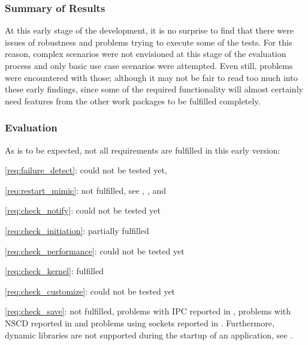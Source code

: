 \subsubsection{Summary of Results}
At this early stage of the development, it is no surprise to find that there were issues of robustness and problems trying to execute some of the tests. For this reason, complex scenarios were not envisioned at this stage of the evaluation process and only basic use case scenarios were attempted. Even still, problems were encountered with those; although it may not be fair to read too much into these early findings, since some of the required functionality will almost certainly need features from the other work packages to be fulfilled completely.

\subsubsection{Evaluation}

As is to be expected, not all requirements are fulfilled in this early version:
\begin{description}
	\item{\ref{req:failure_detect}}: could not be tested yet,
	\item{\ref{req:restart_mimic}}: not fulfilled, see , , and 
	\item{\ref{req:check_notify}}: could not be tested yet
	\item{\ref{req:check_initiation}}: partially fulfilled
	\item{\ref{req:check_performance}}: could not be tested yet
	\item{\ref{req:check_kernel}}: fulfilled
	\item{\ref{req:check_customize}}: could not be tested yet
	\item{\ref{req:check_save}}: not fulfilled, problems with IPC reported in , problems with NSCD reported in  and problems using sockets reported in . Furthermore, dynamic libraries are not supported during the startup of an application, see .
\end{description}

